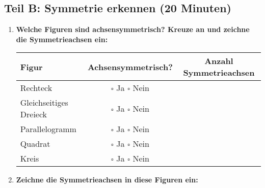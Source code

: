 \subsection*{Teil B: Symmetrie erkennen (20 Minuten)}

\begin{enumerate}[label=\arabic*.]
    \item \textbf{Welche Figuren sind achsensymmetrisch? Kreuze an und zeichne die Symmetrieachsen ein:}
    \vspace{0.5cm}

    \begin{tabular}{|l|c|c|}
        \hline
        \textbf{Figur} & \textbf{Achsensymmetrisch?} & \textbf{Anzahl Symmetrieachsen} \\
        \hline
        Rechteck & $\square$ Ja $\square$ Nein & \underline{\hspace{2cm}} \\
        \hline
        Gleichseitiges Dreieck & $\square$ Ja $\square$ Nein & \underline{\hspace{2cm}} \\
        \hline
        Parallelogramm & $\square$ Ja $\square$ Nein & \underline{\hspace{2cm}} \\
        \hline
        Quadrat & $\square$ Ja $\square$ Nein & \underline{\hspace{2cm}} \\
        \hline
        Kreis & $\square$ Ja $\square$ Nein & \underline{\hspace{2cm}} \\
        \hline
    \end{tabular}

    \vspace{1cm}

    \item \textbf{Zeichne die Symmetrieachsen in diese Figuren ein:}
    \vspace{0.5cm}

\end{enumerate}